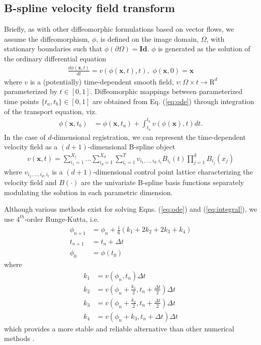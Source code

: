 \documentclass{llncs}
\begin{document}
\subsection{B-spline velocity field transform}

Briefly, as with other diffeomorphic formulations based on vector flows, we
assume the diffeomorphism, $\phi$, is defined on the image domain, $\Omega$, 
with stationary boundaries such that $\phi( \partial \Omega) = \mathbf{Id}$.
$\phi$ is generated as the solution of the ordinary differential
equation 
\begin{align}
  \label{eq:ode}
  \frac{d\phi(\mathbf{x}, t)}{dt} = v(\phi(\mathbf{x}, t), t),\,\,\phi( \mathbf{x}, 0 ) = \mathbf{x}
\end{align}
where $v$ is a (potentially) time-dependent smooth field, $v : \Omega \times t 
\rightarrow \mathrm{R}^d$ parameterized by $t \in [0,1]$.  Diffeomorphic mappings
between parameterized time points $\{t_a,t_b\} \in [0,1]$ 
are obtained from  Eq. (\ref{eq:ode}) through integration of the transport
equation, viz.
\begin{align}
  \label{eq:integral}
\phi(\mathbf{x},t_b) &= \phi(\mathbf{x},t_a) + \int_{t_a}^{t_b} v(\phi(\mathbf{x}), t) dt.
\end{align}
In the case of 
$d$-dimensional registration, we can represent the time-dependent velocity field  
as a $(d + 1)$-dimensional B-spline object
\begin{align}
v(\mathbf{x}, t) = \sum_{i_1=1}^{X_1}\ldots\sum_{i_d=1}^{X_d}\sum_{i_t=1}^T v_{i_1,\ldots,i_d,i_t} B_{i_t}(t) \prod_{j=1}^d B_{i_j}(x_j)
\end{align}
where $v_{i_1,\ldots,i_d,i_t}$ is a $(d+1)$-dimensional control point lattice
characterizing the velocity field and $B(\cdot)$ are the univariate B-spline
basis functions separately modulating the solution in each parametric dimension.

Although various methods exist for solving Eqns. (\ref{eq:ode}) and (\ref{eq:integral}),
we use $4^{th}$-order Runge-Kutta, i.e.
\begin{align}
  \phi_{n+1} &= \phi_{n} + \frac{1}{6}\left( k_1 + 2k_2 + 2k_3 + k_4 \right) \\
  t_{n+1} &= t_{n} + \Delta t \\ 
  \phi_0 &= \phi(t_0) 
\end{align}
where
\begin{align}
  k_1 &= v\left( \phi_{n}, t_{n} \right)\Delta t \\
  k_2 &= v\left( \phi_{n} + \frac{k_1}{2}, t_{n} + \frac{\Delta t}{2} \right)\Delta t \\
  k_3 &= v\left( \phi_{n} + \frac{k_2}{2}, t_{n} + \frac{\Delta t}{2} \right)\Delta t \\
  k_4 &= v\left( \phi_{n} + k_3, t_{n} + \Delta t \right)\Delta t
\end{align}  
which provides a more stable and reliable alternative than other numerical
methods \cite{press1996}.
\end{document}
